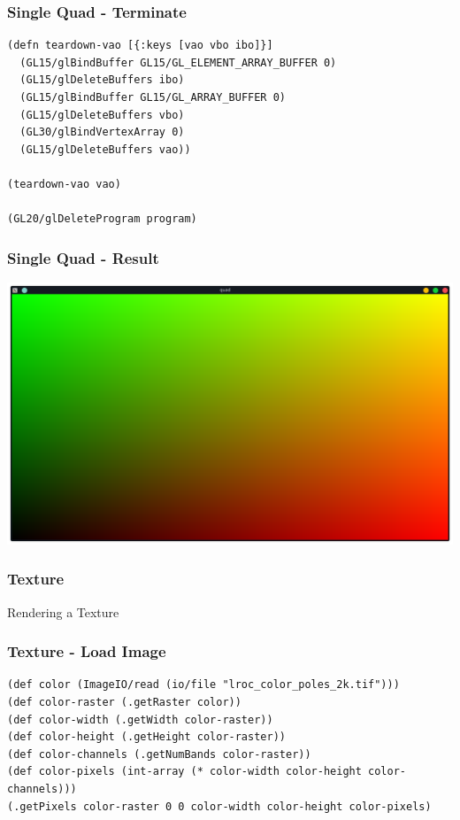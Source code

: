 \documentclass[aspectratio=169,11pt,xcolor=dvipsnames]{beamer}
\begin{document}
\begin{frame}[fragile]
  \frametitle{Single Quad {-} Terminate}
  \begin{verbatim}
(defn teardown-vao [{:keys [vao vbo ibo]}]
  (GL15/glBindBuffer GL15/GL_ELEMENT_ARRAY_BUFFER 0)
  (GL15/glDeleteBuffers ibo)
  (GL15/glBindBuffer GL15/GL_ARRAY_BUFFER 0)
  (GL15/glDeleteBuffers vbo)
  (GL30/glBindVertexArray 0)
  (GL15/glDeleteBuffers vao))

(teardown-vao vao)

(GL20/glDeleteProgram program)
  \end{verbatim}
\end{frame}

\begin{frame}
  \frametitle{Single Quad {-} Result}
  \begin{center}
    \includegraphics[width=.8\textwidth]{quad}
  \end{center}
\end{frame}

\begin{frame}
  \frametitle{Texture}
  \begin{center}
    \begin{huge}
      Rendering a Texture
    \end{huge}
  \end{center}
\end{frame}

\begin{frame}[fragile]
  \frametitle{Texture {-} Load Image}
  \begin{verbatim}
(def color (ImageIO/read (io/file "lroc_color_poles_2k.tif")))
(def color-raster (.getRaster color))
(def color-width (.getWidth color-raster))
(def color-height (.getHeight color-raster))
(def color-channels (.getNumBands color-raster))
(def color-pixels (int-array (* color-width color-height color-channels)))
(.getPixels color-raster 0 0 color-width color-height color-pixels)
  \end{verbatim}
\end{frame}
\end{document}

